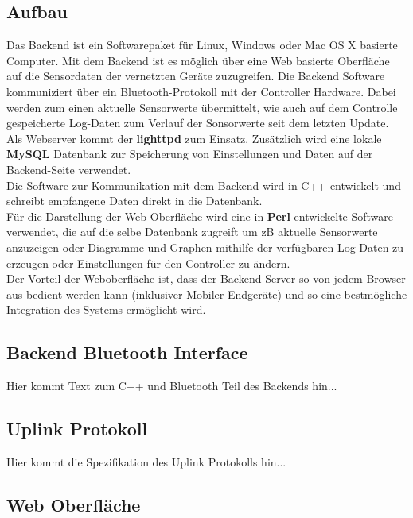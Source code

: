 \documentclass[12pt,a4paper]{article}
\begin{document}
\subsection{Aufbau}

Das Backend ist ein Softwarepaket für Linux, Windows oder Mac OS X basierte Computer. Mit dem Backend ist es möglich über eine Web basierte Oberfläche auf die Sensordaten der vernetzten Geräte zuzugreifen. Die Backend Software kommuniziert über ein Bluetooth-Protokoll mit der Controller Hardware. Dabei werden zum einen aktuelle Sensorwerte übermittelt, wie auch auf dem Controlle gespeicherte Log-Daten zum Verlauf der Sonsorwerte seit dem letzten Update.\\
Als Webserver kommt der {\bf lighttpd} zum Einsatz. Zusätzlich wird eine lokale {\bf MySQL} Datenbank zur Speicherung von Einstellungen und Daten auf der Backend-Seite verwendet.\\
Die Software zur Kommunikation mit dem Backend wird in C++ entwickelt und schreibt empfangene Daten direkt in die Datenbank.\\
Für die Darstellung der Web-Oberfläche wird eine in {\bf Perl} entwickelte Software verwendet, die auf die selbe Datenbank zugreift um zB aktuelle Sensorwerte anzuzeigen oder Diagramme und Graphen mithilfe der verfügbaren Log-Daten zu erzeugen oder Einstellungen für den Controller zu ändern.\\
Der Vorteil der Weboberfläche ist, dass der Backend Server so von jedem Browser aus bedient werden kann (inklusiver Mobiler Endgeräte) und so eine bestmögliche Integration des Systems ermöglicht wird.

\subsection{Backend Bluetooth Interface}
\label{subsec:BTBackend}

Hier kommt Text zum C++ und Bluetooth Teil des Backends hin...

\subsection{Uplink Protokoll}

Hier kommt die Spezifikation des Uplink Protokolls hin...

\subsection{Web Oberfläche}
\end{document}
